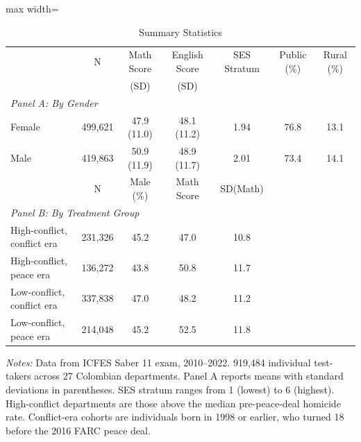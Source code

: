 \begin{table}[htbp]
\centering
\caption{Summary Statistics}
\label{tab:summary}
\begin{adjustbox}{max width=\textwidth}
\begin{tabular}{lcccccc}
\hline\hline
& N & Math Score & English Score & SES Stratum & Public (\%) & Rural (\%) \\
& & (SD) & (SD) & & & \\
\hline
\multicolumn{7}{l}{\textit{Panel A: By Gender}} \\[3pt]
Female & 499,621 & 47.9 (11.0) & 48.1 (11.2) & 1.94 & 76.8 & 13.1 \\
Male & 419,863 & 50.9 (11.9) & 48.9 (11.7) & 2.01 & 73.4 & 14.1 \\
\hline
& N & Male (\%) & Math Score & SD(Math) & & \\
\hline
\multicolumn{7}{l}{\textit{Panel B: By Treatment Group}} \\[3pt]
High-conflict, conflict era & 231,326 & 45.2 & 47.0 & 10.8 & & \\
High-conflict, peace era & 136,272 & 43.8 & 50.8 & 11.7 & & \\
Low-conflict, conflict era & 337,838 & 47.0 & 48.2 & 11.2 & & \\
Low-conflict, peace era & 214,048 & 45.2 & 52.5 & 11.8 & & \\
\hline\hline
\end{tabular}
\end{adjustbox}
\begin{flushleft}\small
\textit{Notes:} Data from ICFES Saber 11 exam, 2010--2022. 919,484 individual test-takers across 27 Colombian departments. Panel A reports means with standard deviations in parentheses. SES stratum ranges from 1 (lowest) to 6 (highest). High-conflict departments are those above the median pre-peace-deal homicide rate. Conflict-era cohorts are individuals born in 1998 or earlier, who turned 18 before the 2016 FARC peace deal.
\end{flushleft}
\end{table}
